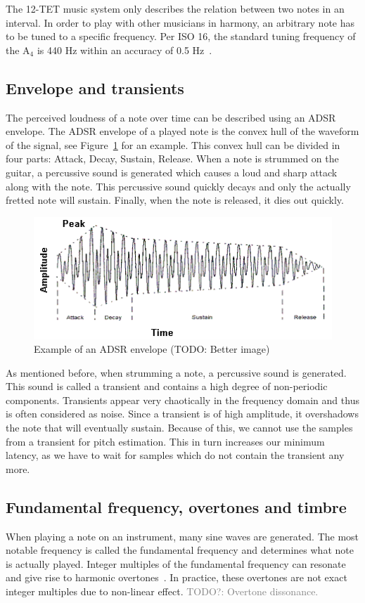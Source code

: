 \documentclass[10pt,twocolumn]{article}
\newcommand{\note}[2]{#1${}_{#2}$}
\begin{document}
The 12-TET music system only describes the relation between two notes in an interval. In order to play with other musicians in harmony, an arbitrary note has to be tuned to a specific frequency. Per ISO 16, the standard tuning frequency of the \note{A}{4} is 440 Hz within an accuracy of 0.5 Hz~\cite{isoa}.

\subsection{Envelope and transients}
The perceived loudness of a note over time can be described using an ADSR envelope. The ADSR envelope of a played note is the convex hull of the waveform of the signal, see Figure~\ref{fig:adsr} for an example. This convex hull can be divided in four parts: Attack, Decay, Sustain, Release. When a note is strummed on the guitar, a percussive sound is generated which causes a loud and sharp attack along with the note. This percussive sound quickly decays and only the actually fretted note will sustain. Finally, when the note is released, it dies out quickly.
\begin{figure}[H]
    \centering
    \includegraphics[width=\linewidth]{fig/envelope.png}
    \caption{Example of an ADSR envelope (TODO: Better image)}
    \label{fig:adsr}
\end{figure}

As mentioned before, when strumming a note, a percussive sound is generated. This sound is called a transient and contains a high degree of non-periodic components. Transients appear very chaotically in the frequency domain and thus is often considered as noise. Since a transient is of high amplitude, it overshadows the note that will eventually sustain. Because of this, we cannot use the samples from a transient for pitch estimation. This in turn increases our minimum latency, as we have to wait for samples which do not contain the transient any more.

\subsection{Fundamental frequency, overtones and timbre}
When playing a note on an instrument, many sine waves are generated. The most notable frequency is called the fundamental frequency and determines what note is actually played. Integer multiples of the fundamental frequency can resonate and give rise to harmonic overtones~\cite{overtones}. In practice, these overtones are not exact integer multiples due to non-linear effect.%
\textcolor{gray}{TODO?: Overtone dissonance.}
\end{document}
